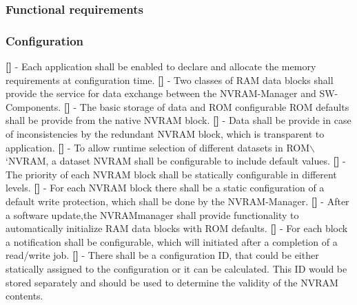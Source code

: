 \subsubsection{Functional requirements}

\subsubsection{Configuration}
{\bf []} - Each application shall be enabled to declare and allocate the memory requirements at configuration time.\newline
\newline
{\bf []} - Two classes of RAM data blocks shall provide the service for data exchange between the NVRAM-Manager and SW-Components.\newline
\newline
{\bf []} - The basic storage of data and ROM configurable ROM defaults shall be provide from the native \mbox{NVRAM} block.\newline
\newline
{\bf []} - Data shall be provide in case of inconsistencies by the redundant  \mbox{NVRAM} block, which is transparent to application.\newline
\newline
{\bf []} - To allow runtime selection of different datasets in \mbox{ROM$\backslash$`NVRAM}, a dataset  \mbox{NVRAM} shall be configurable to include default values.\newline
\newline
{\bf []} - The priority of each NVRAM block shall be statically configurable in different levels.\newline\newline
{\bf []} - For each \mbox{NVRAM} block there shall be a static configuration of a default write protection, which shall be done by the \mbox{NVRAM-Manager}.\newline
\newline
{\bf []} - After a software update,the \mbox{NVRAM}manager shall provide functionality to automatically initialize RAM data blocks with ROM defaults.\newline
\newline
{\bf []} - For each block a notification shall be configurable, which will initiated after a completion of a read/write job.\newline
\newline
{\bf []} - There shall be a configuration ID, that could be either statically assigned to the configuration or it can be calculated. This ID would be stored separately and should be used to determine the validity of the NVRAM contents.\newline
